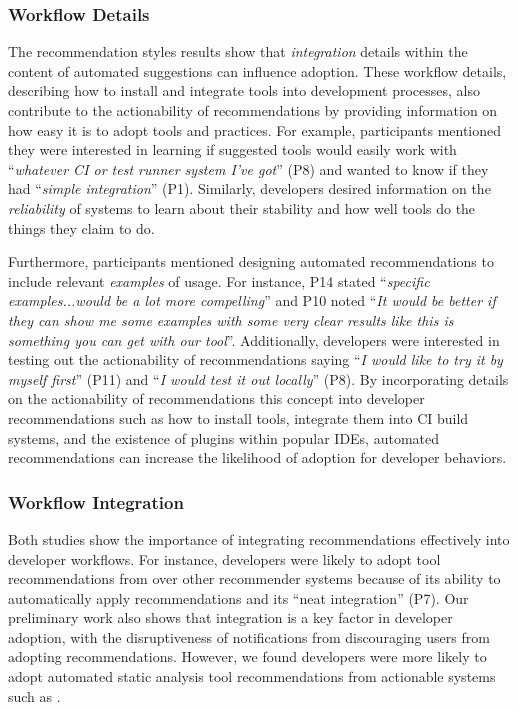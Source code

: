 \subsubsection*{Workflow Details}

The recommendation styles results show that \textit{integration} details within the content of automated suggestions can influence adoption. These workflow details, describing how to install and integrate tools into development processes, also contribute to the actionability of recommendations by providing information on how easy it is to adopt tools and practices. For example, participants mentioned they were interested in learning if suggested tools would easily work with ``\textit{whatever CI or test runner system I've got}'' (P8) and wanted to know if they had ``\textit{simple integration}'' (P1). Similarly, developers desired information on the \textit{reliability} of systems to learn about their stability and how well tools do the things they claim to do.

Furthermore, participants mentioned designing automated recommendations to include relevant \textit{examples} of usage. For instance, P14 stated ``\textit{specific examples...would be a lot more compelling}'' and P10 noted ``\textit{It would be better if they can show me some examples with some very clear results like this is something you can get with our tool}''. Additionally, developers were interested in testing out the actionability of recommendations saying  ``\textit{I would like to try it by myself first}'' (P11) and ``\textit{I would test it out locally}'' (P8). By incorporating details on the actionability of recommendations this concept into developer recommendations such as how to install tools, integrate them into CI build systems, and the existence of plugins within popular IDEs, automated recommendations can increase the likelihood of adoption for developer behaviors. 


\subsubsection{Workflow Integration} 

Both \suggs studies show the importance of integrating recommendations effectively into developer workflows. For instance, developers were likely to adopt tool recommendations from \sugg over other recommender systems because of its ability to automatically apply recommendations and its ``neat integration'' (P7). Our preliminary work also shows that integration is a key factor in developer adoption, with the disruptiveness of notifications from \toolone discouraging users from adopting recommendations. However, we found developers were more likely to adopt automated static analysis tool recommendations from actionable systems such as \suggs. 

